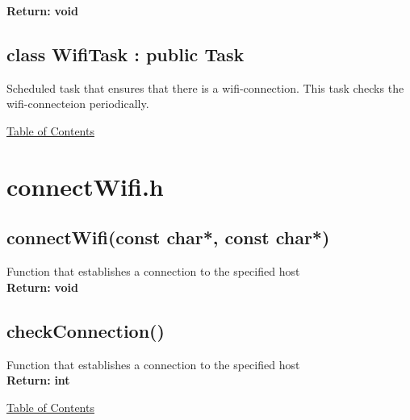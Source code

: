 \documentclass[11pt, numbers=endperiod]{report}
\newcommand{\Vseparation}{\vspace{10mm}}
\newcommand{\setColor}[1]
			{\color{blue!}\textbf{#1}\color{black!}}
\newcommand\MySection[2][\DefaultOpt]{%
  \def\DefaultOpt{#2}%
  \color{cyan!}\section[#1]{#2}\color{black!}%
}
\begin{document}
\begin{tcolorbox}[colback=white,colframe=cyan,width=\dimexpr\textwidth+12mm\relax,enlarge left by=-6mm]
\begin{tcolorbox}[colback=white,colframe=cyan,width=\dimexpr\textwidth+4mm\relax,enlarge left by=-2mm]
\textbf{Return:} \setColor{void}
\Vseparation


\end{tcolorbox}

\subsection*{class WifiTask : public Task}
Scheduled task that ensures that there is a wifi-connection. This task checks the wifi-connecteion periodically.\\

\end{tcolorbox}

\hyperlink{toc}{Table of Contents}


\MySection{connectWifi.h}
\label{sec: connectWifi.h}
\begin{tcolorbox}[colback=white,colframe=cyan,width=\dimexpr\textwidth+12mm\relax,enlarge left by=-6mm]


\subsection*{connectWifi(const char*, const char*)}
Function that establishes a connection to the specified host\\

\textbf{Return:} \setColor{void}
\Vseparation

\subsection*{checkConnection()}
Function that establishes a connection to the specified host\\

\textbf{Return:} \setColor{int}
\Vseparation


\end{tcolorbox}

\hyperlink{toc}{Table of Contents}
\end{document}
